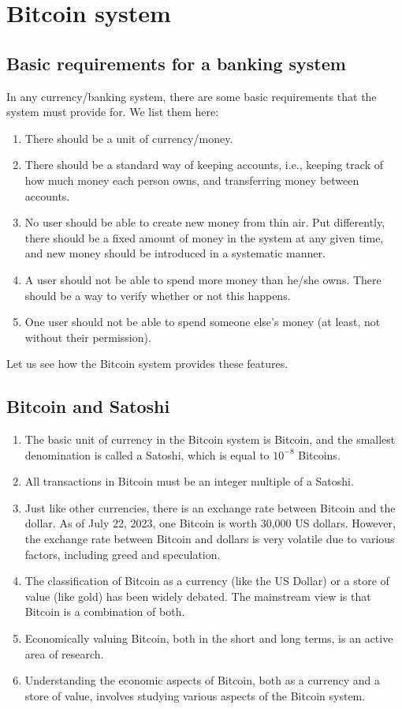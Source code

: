 \chapter{Bitcoin system}
\section{Basic requirements for a banking system}
In any currency/banking system, there are some basic requirements that the system must provide for. We list them here:
\begin{enumerate}
	\item There should be a unit of currency/money.
	\item There should be a standard way of keeping accounts, i.e., keeping track of how much money each person owns, and transferring money between accounts.
	\item No user should be able to create new money from thin air. Put diﬀerently, there should be a
	fixed amount of money in the system at any given time, and new money should be introduced in a systematic manner.
	\item A user should not be able to spend more money than he/she owns. There should be a way to verify whether or not this happens.
	\item One user should not be able to spend someone else’s money (at least, not without their permission).
	
\end{enumerate}
Let us see how the Bitcoin system provides these features.

\section{Bitcoin and Satoshi}
\begin{enumerate}
	\item The basic unit of currency in the Bitcoin system is Bitcoin, and the smallest denomination is called a Satoshi, which is equal to $10^{-8}$ Bitcoins.
	\item All transactions in Bitcoin must be an integer multiple of a Satoshi.
	\item Just like other currencies, there is an exchange rate between Bitcoin and the dollar. As of July 22, 2023, one Bitcoin is worth 30,000 US dollars. However, the exchange rate between Bitcoin and dollars is very volatile due to various factors, including greed and speculation.
	\item The classification of Bitcoin as a currency (like the US Dollar) or a store of value (like gold) has been widely debated. The mainstream view is that Bitcoin is a combination of both.
	\item Economically valuing Bitcoin, both in the short and long terms, is an active area of research.
	\item Understanding the economic aspects of Bitcoin, both as a currency and a store of value, involves studying various aspects of the Bitcoin system.
\end{enumerate}

